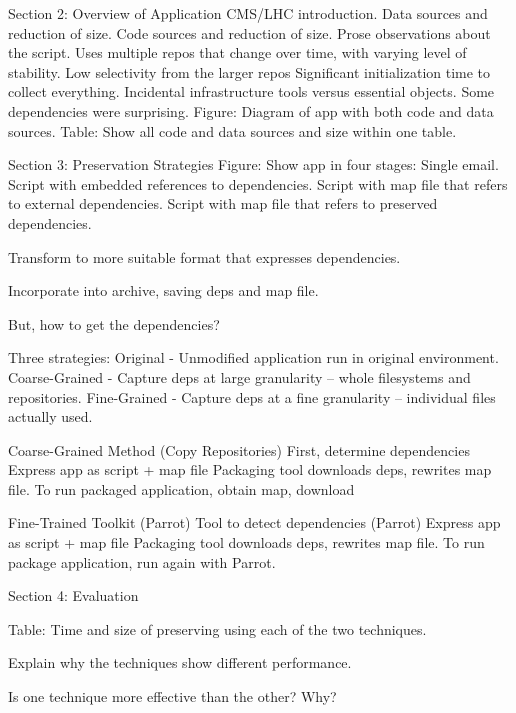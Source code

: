 \documentclass{sig-alternate}
\begin{document}
Section 2: Overview of Application
    CMS/LHC introduction.
    Data sources and reduction of size.
    Code sources and reduction of size.
    Prose observations about the script.
        Uses multiple repos that change over time, with varying level of stability.
        Low selectivity from the larger repos
        Significant initialization time to collect everything.
        Incidental infrastructure tools versus essential objects.
        Some dependencies were surprising.
    Figure: Diagram of app with both code and data sources.
    Table: Show all code and data sources and size within one table.

Section 3: Preservation Strategies
    Figure: Show app in four stages:
        Single email.
        Script with embedded references to dependencies.
        Script with map file that refers to external dependencies.
        Script with map file that refers to preserved dependencies.

    Transform to more suitable format that expresses dependencies.

    Incorporate into archive, saving deps and map file.

    But, how to get the dependencies?

    Three strategies:
        Original - Unmodified application run in original environment.
        Coarse-Grained - Capture deps at large granularity -- whole filesystems and repositories.
        Fine-Grained - Capture deps at a fine granularity -- individual files actually used.

    Coarse-Grained Method (Copy Repositories)
        First, determine dependencies
        Express app as script + map file
        Packaging tool downloads deps, rewrites map file.
        To run packaged application, obtain map, download

    Fine-Trained Toolkit (Parrot)
        Tool to detect dependencies (Parrot)
        Express app as script + map file
        Packaging tool downloads deps, rewrites map file.
        To run package application, run again with Parrot.

Section 4: Evaluation

    Table: Time and size of preserving using each of the two techniques.

    Explain why the techniques show different performance.

    Is one technique more effective than the other?  Why?
\fi
\end{document}
